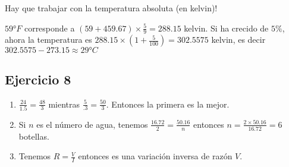 Hay que trabajar con la temperatura absoluta (en kelvin)!

$59°F$ corresponde a ${(59+459.67)} \times \frac{5}{9} = 288.15$ kelvin.
Si ha crecido de $5\%$, ahora la temperatura es
$288.15 \times \left(1+\frac{5}{100}\right)= 302.5575$ kelvin, es decir
$302.5575 - 273.15 \approx 29°C$

\subsection*{Ejercicio 8}

\begin{enumerate}
\item $\frac{24}{1.5} = \frac{48}{3}$ mientras
  $\frac{5}{.3} = \frac{50}{3}$. Entonces la primera es la mejor.
\item Si $n$ es el número de agua, tenemos
  $\frac{16.72}{2} = \frac{50.16}{n}$ entonces
  $n = \frac{2 \times 50.16}{16.72} = 6$ botellas.
\item Tenemos $R = \frac{V}{I}$ entonces es una variación inversa de razón $V$.
\end{enumerate}
